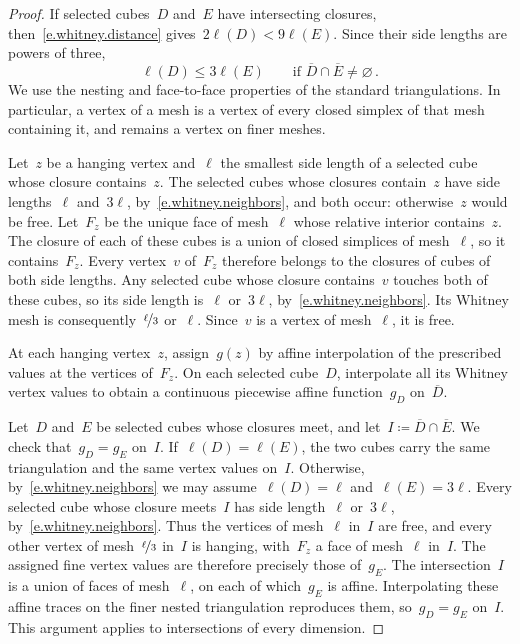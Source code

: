 \documentclass[11pt,letterpaper]{article}
\numberwithin{equation}{section}
\theoremstyle{definition}
\newcommand{\nf}{\nicefrac}
\begin{document}
\begin{proof}
If selected cubes~$D$ and~$E$ have intersecting closures, then~\eqref{e.whitney.distance} gives~$2\ell(D)<9\ell(E)$. Since their side lengths are powers of three,
\begin{equation}
	\ell(D)\leq3\ell(E)\qquad\mbox{if }\overline D\cap\overline E\neq\varnothing\,.
	\label{e.whitney.neighbors}
\end{equation}
We use the nesting and face-to-face properties of the standard triangulations. In particular, a vertex of a mesh is a vertex of every closed simplex of that mesh containing it, and remains a vertex on finer meshes.

\smallskip

Let~$z$ be a hanging vertex and~$\ell$ the smallest side length of a selected cube whose closure contains~$z$. The selected cubes whose closures contain~$z$ have side lengths~$\ell$ and~$3\ell$, by~\eqref{e.whitney.neighbors}, and both occur: otherwise~$z$ would be free. Let~$F_z$ be the unique face of mesh~$\ell$ whose relative interior contains~$z$. The closure of each of these cubes is a union of closed simplices of mesh~$\ell$, so it contains~$F_z$. Every vertex~$v$ of~$F_z$ therefore belongs to the closures of cubes of both side lengths. Any selected cube whose closure contains~$v$ touches both of these cubes, so its side length is~$\ell$ or~$3\ell$, by~\eqref{e.whitney.neighbors}. Its Whitney mesh is consequently~$\nf\ell3$ or~$\ell$. Since~$v$ is a vertex of mesh~$\ell$, it is free.

\smallskip

At each hanging vertex~$z$, assign~$g(z)$ by affine interpolation of the prescribed values at the vertices of~$F_z$. On each selected cube~$D$, interpolate all its Whitney vertex values to obtain a continuous piecewise affine function~$g_D$ on~$\overline D$.

\smallskip

Let~$D$ and~$E$ be selected cubes whose closures meet, and let~$I\coloneqq\overline D\cap\overline E$. We check that~$g_D=g_E$ on~$I$. If~$\ell(D)=\ell(E)$, the two cubes carry the same triangulation and the same vertex values on~$I$. Otherwise, by~\eqref{e.whitney.neighbors} we may assume~$\ell(D)=\ell$ and~$\ell(E)=3\ell$. Every selected cube whose closure meets~$I$ has side length~$\ell$ or~$3\ell$, by~\eqref{e.whitney.neighbors}. Thus the vertices of mesh~$\ell$ in~$I$ are free, and every other vertex of mesh~$\nf\ell3$ in~$I$ is hanging, with~$F_z$ a face of mesh~$\ell$ in~$I$. The assigned fine vertex values are therefore precisely those of~$g_E$. The intersection~$I$ is a union of faces of mesh~$\ell$, on each of which~$g_E$ is affine. Interpolating these affine traces on the finer nested triangulation reproduces them, so~$g_D=g_E$ on~$I$. This argument applies to intersections of every dimension.


\end{proof}
\end{document}

